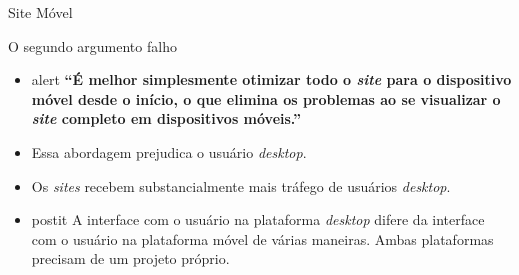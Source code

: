 \begin{frame}{Site Móvel}
\begin{block}{O segundo argumento falho}
  \begin{itemize}
    \item<1->[]
      \begin{beamercolorbox}[sep=1em]{alert}
        \textbf{``É melhor simplesmente otimizar todo o \emph{site} para o dispositivo móvel desde o início, o que elimina os problemas ao se visualizar o \emph{site} completo em dispositivos móveis.''}
      \end{beamercolorbox}
    \item<2-> Essa abordagem prejudica o usuário \emph{desktop}.
    \item<3-> Os \emph{sites} recebem substancialmente mais tráfego de usuários \emph{desktop}.
    \bigskip
    \item<4->[]
    \begin{beamercolorbox}[sep=1em]{postit}
      A interface com o usuário na plataforma \emph{desktop} difere da interface com o usuário na plataforma móvel de várias maneiras. Ambas plataformas precisam de um projeto próprio.
    \end{beamercolorbox}
  \end{itemize}
\end{block}
\end{frame}
